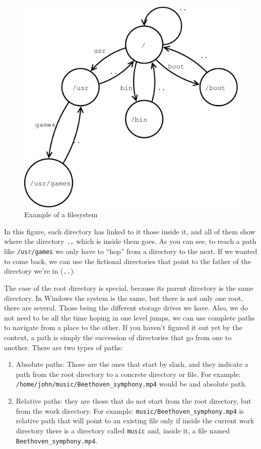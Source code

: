 \documentclass[a4paper]{article}
\begin{document}
\begin{figure}[H]
    \includegraphics[width=\linewidth]{filesystems}
    \caption{Example of a filesystem}
    \label{img:extensions}
\end{figure}

In this figure, each directory has linked to it those inside it, and all of them
show where the directory \verb!..! which is inside them goes. As you can see, to
reach a path like \verb!/usr/games! we only have to ``hop'' from a directory to
the next. If we wanted to come back, we can use the fictional directories that
point to the father of the directory we're in (\verb!..!).

The case of the root
directory is special, because its parent directory is the same directory. In
Windows the system is the same, but there is not only one root, there are
several. Those being the different storage drives we have. Also, we do not need
to be all the time hoping in one level jumps, we can use complete paths to
navigate from a place to the other. If you haven't figured it out yet by the
context, a path is simply the succession of directories that go from one to
another. There are two types of paths:
\begin{enumerate}
    \item Absolute paths: Those are the ones that start by slash, and they
    indicate a path from the root directory to a concrete directory or file.
    For example: \verb!/home/john/music/Beethoven_symphony.mp4! would be and
    absolute path.
    \item Relative paths: they are those that do not start from the root
    directory, but from the work directory. For example:
    \verb!music/Beethoven_symphony.mp4! is relative path that will point to
    an existing file only if inside the current work directory there is a
    directory called \verb!music! and, inside it, a file named
    \verb!Beethoven_symphony.mp4!.
\end{enumerate}
\end{document}
